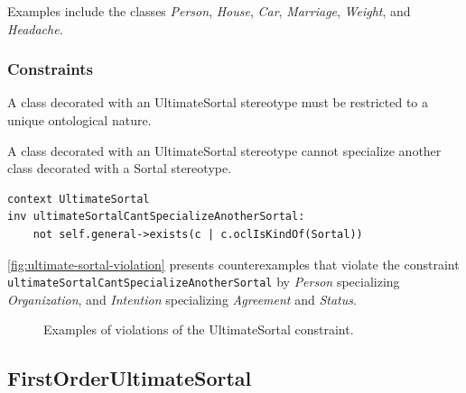 Examples include the classes \textit{Person}, \textit{House}, \textit{Car}, \textit{Marriage}, \textit{Weight}, and \textit{Headache}.

\subsubsection{Constraints}

\begin{constraint}
\label{constraint:ultimateSortalUniqueNatureRestriction}
A class decorated with an UltimateSortal stereotype must be restricted to a unique ontological nature. 

\end{constraint}

\begin{constraint}
\label{constraint:ultimateSortalCantSpecializeAnotherSortal}
A class decorated with an UltimateSortal stereotype cannot specialize another class decorated with a Sortal stereotype. 

\begin{lstlisting}[language=OCL]
context UltimateSortal 
inv ultimateSortalCantSpecializeAnotherSortal:
    not self.general->exists(c | c.oclIsKindOf(Sortal))
\end{lstlisting}
\end{constraint}

\autoref{fig:ultimate-sortal-violation} presents counterexamples that violate the constraint \texttt{ultimateSortalCantSpecializeAnotherSortal} by \textit{Person} specializing
\textit{Organization}, and \textit{Intention} specializing \textit{Agreement} and \textit{Status}.

\begin{figure}[h]
    \centering
    
    \caption{Examples of violations of the UltimateSortal constraint.}
    \label{fig:ultimate-sortal-violation}
\end{figure}


\FloatBarrier

\subsection{FirstOrderUltimateSortal}
\label{stereotype:firstOrderUltimateSortal}


